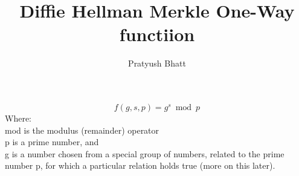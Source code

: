 \documentclass[11pt]{article}
\title{\textbf{Diffie Hellman Merkle One-Way functiion}}
\author{Pratyush Bhatt}
\date{}
\begin{document}
\begin{equation}
f(g, s, p) = g ^ s \bmod p
\end{equation}
Where:\\
mod is the modulus (remainder) operator\\
 p is a prime number, and\\
 g is a number chosen from a special group of numbers, related to
   the prime number p, for which a particular relation holds true
   (more on this later).
\end{document}
